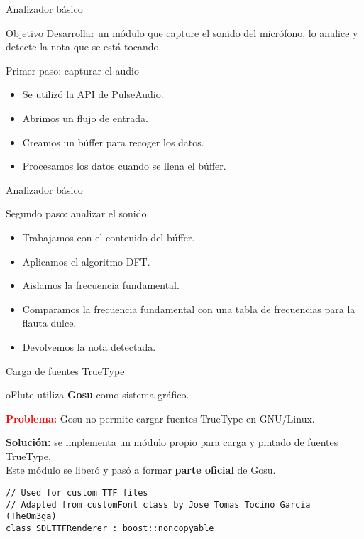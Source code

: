 \begin{frame}{Analizador básico}
  \begin{block}{Objetivo}
    Desarrollar un módulo que capture el sonido del micrófono, lo analice y
    detecte la nota que se está tocando.
  \end{block}

  \pause

  \begin{block}{Primer paso: capturar el audio}
    \begin{itemize}
    \item Se utilizó la API de PulseAudio.
    \item Abrimos un flujo de entrada.
    \item Creamos un búffer para recoger los datos.
    \item Procesamos los datos cuando se llena el búffer.
    \end{itemize}
    
  \end{block}
\end{frame}

\begin{frame}{Analizador básico}
  \begin{block}{Segundo paso: analizar el sonido}
    \begin{itemize}
    \item Trabajamos con el contenido del búffer.
    \item Aplicamos el algoritmo DFT.
    \item Aislamos la frecuencia fundamental.
    \item Comparamos la frecuencia fundamental con una tabla de frecuencias para
      la flauta dulce.
    \item Devolvemos la nota detectada.
    \end{itemize}
  \end{block}  
\end{frame}

\begin{frame}[fragile]{Carga de fuentes TrueType}
  \begin{center}
    oFlute utiliza \textbf{Gosu} como sistema gráfico.
    
    \pause
    \medskip
    
    \textcolor{red}{\textbf{Problema:}} Gosu no permite cargar fuentes TrueType
    en GNU/Linux.

    \pause
    \medskip
    
    \textcolor{dgreen}{\textbf{Solución:}} se implementa un módulo propio para
    carga y pintado de fuentes TrueType. \pause\\[1em]Este módulo se liberó y pasó a
    formar \textbf{parte oficial} de Gosu.
  \end{center}
  \begin{verbatim}
// Used for custom TTF files
// Adapted from customFont class by Jose Tomas Tocino Garcia (TheOm3ga)
class SDLTTFRenderer : boost::noncopyable
  \end{verbatim}
\end{frame}


